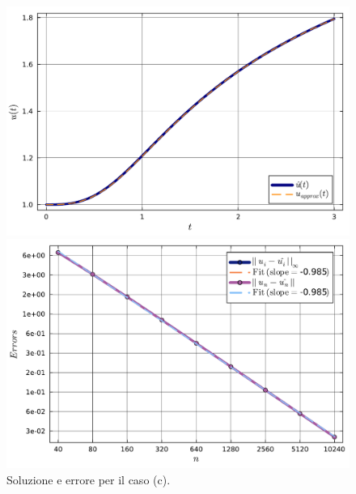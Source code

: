 \documentclass[letterpaper, 12pt]{article}
\numberwithin{equation}{section}    %
\begin{document}
\begin{figure}[!ht]
    \centering
    \begin{minipage}[b]{0.47\textwidth}
        \includegraphics[width=\textwidth]{6225.pdf}
    \end{minipage}
    \hspace{0.5cm}
    \begin{minipage}[b]{0.47\textwidth}
        \includegraphics[width=\textwidth]{6226.pdf}
    \end{minipage}
    \caption{Soluzione e errore per il caso (c).}
    \label{fig:es6_2_1_3}
\end{figure}
\end{document}
